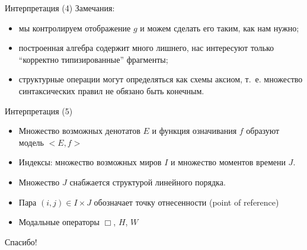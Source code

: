 \documentclass{beamer}
\begin{document}
\begin{frame}{Интерпретация (4)}
Замечания:\\
\bigskip
\begin{itemize}
  \item мы контролируем отображение $g$ и можем сделать его таким, как нам нужно;
  \item построенная алгебра содержит много лишнего, нас интересуют только ``корректно типизированные'' фрагменты;
  \item структурные операции могут определяться как схемы аксиом, т.~е. множество синтаксических правил не обязано быть конечным.
\end{itemize}
\end{frame}

\begin{frame}{Интерпретация (5)}
\begin{itemize}
  \item Множество возможных денотатов $E$ и функция означивания $f$ образуют модель $< \! E, f \!>$
  \item Индексы: множество возможных миров $I$ и множество моментов времени $J$.
  \item Множество $J$ снабжается структурой линейного порядка.
  \item Пара $(i, j) \in I \times J$ обозначает точку отнесенности (point of reference)
  \item Модальные операторы $\Box$, $H$, $W$
\end{itemize}
\end{frame}

\begin{frame}{}
    \thispagestyle{empty}
    \begin{center}
        {\large Спасибо!}
    \end{center}
\end{frame}


\end{document}
